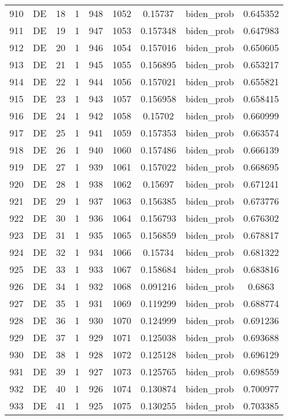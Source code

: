 \documentclass[12pt,a4paper]{article}
\begin{document}
\begin{tabular}{r|cccccccc}
	910 & DE & 18 & 1 & 948 & 1052 & 0.15737 & biden\_prob & 0.645352 \\
	911 & DE & 19 & 1 & 947 & 1053 & 0.157348 & biden\_prob & 0.647983 \\
	912 & DE & 20 & 1 & 946 & 1054 & 0.157016 & biden\_prob & 0.650605 \\
	913 & DE & 21 & 1 & 945 & 1055 & 0.156895 & biden\_prob & 0.653217 \\
	914 & DE & 22 & 1 & 944 & 1056 & 0.157021 & biden\_prob & 0.655821 \\
	915 & DE & 23 & 1 & 943 & 1057 & 0.156958 & biden\_prob & 0.658415 \\
	916 & DE & 24 & 1 & 942 & 1058 & 0.15702 & biden\_prob & 0.660999 \\
	917 & DE & 25 & 1 & 941 & 1059 & 0.157353 & biden\_prob & 0.663574 \\
	918 & DE & 26 & 1 & 940 & 1060 & 0.157486 & biden\_prob & 0.666139 \\
	919 & DE & 27 & 1 & 939 & 1061 & 0.157022 & biden\_prob & 0.668695 \\
	920 & DE & 28 & 1 & 938 & 1062 & 0.15697 & biden\_prob & 0.671241 \\
	921 & DE & 29 & 1 & 937 & 1063 & 0.156385 & biden\_prob & 0.673776 \\
	922 & DE & 30 & 1 & 936 & 1064 & 0.156793 & biden\_prob & 0.676302 \\
	923 & DE & 31 & 1 & 935 & 1065 & 0.156859 & biden\_prob & 0.678817 \\
	924 & DE & 32 & 1 & 934 & 1066 & 0.15734 & biden\_prob & 0.681322 \\
	925 & DE & 33 & 1 & 933 & 1067 & 0.158684 & biden\_prob & 0.683816 \\
	926 & DE & 34 & 1 & 932 & 1068 & 0.091216 & biden\_prob & 0.6863 \\
	927 & DE & 35 & 1 & 931 & 1069 & 0.119299 & biden\_prob & 0.688774 \\
	928 & DE & 36 & 1 & 930 & 1070 & 0.124999 & biden\_prob & 0.691236 \\
	929 & DE & 37 & 1 & 929 & 1071 & 0.125038 & biden\_prob & 0.693688 \\
	930 & DE & 38 & 1 & 928 & 1072 & 0.125128 & biden\_prob & 0.696129 \\
	931 & DE & 39 & 1 & 927 & 1073 & 0.125765 & biden\_prob & 0.698559 \\
	932 & DE & 40 & 1 & 926 & 1074 & 0.130874 & biden\_prob & 0.700977 \\
	933 & DE & 41 & 1 & 925 & 1075 & 0.130255 & biden\_prob & 0.703385 \\

\end{tabular}
\end{document}
